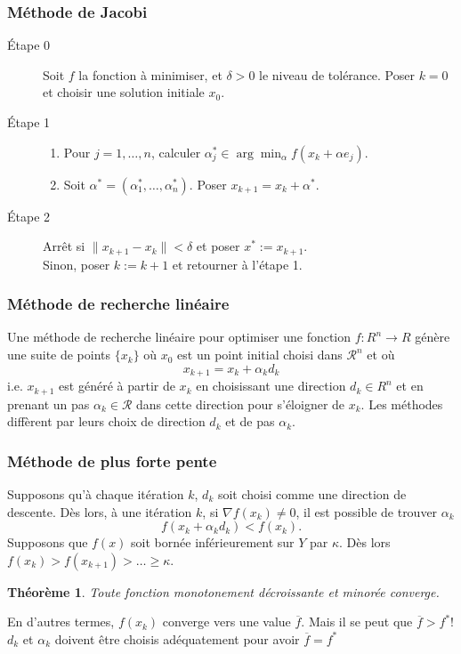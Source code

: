 \documentclass[usepdftitle=false]{beamer}
\newtheorem{thm}{Théorème}
\def\cR{\mathcal{R}}
\begin{document}
\begin{frame}
\frametitle{Méthode de Jacobi}
	
	\begin{description}
		\item[Étape 0]
		Soit $f$ la fonction à minimiser, et $\delta > 0$ le niveau de tolérance.
		Poser $k = 0$ et choisir une solution initiale $x_0$.
		\item[Étape 1]
		\begin{enumerate}
			\item
			Pour $j = 1,\ldots,n$,
				calculer $\alpha_j^* \in \arg\min_{\alpha} f(x_k + \alpha e_j)$.
			\item
			Soit $\alpha^* = (\alpha_1^*,\ldots, \alpha_n^*)$.
			Poser $x_{k+1} = x_k + \alpha^*$.
		\end{enumerate}
		\item[Étape 2]
		Arrêt si $\| x_{k + 1} - x_k \| < \delta$ et poser $x^* := x_{k+1}$.\\
		Sinon, poser $k := k+1$ et retourner à l'étape 1.
	\end{description}

\end{frame}

\begin{frame}
\frametitle{Méthode de recherche linéaire}

Une méthode de recherche linéaire pour optimiser une fonction $f: R^n \rightarrow R$
génère une suite de points $\{ x_k \}$ où $x_0$ est un point initial choisi dans $\cR^n$ et où
$$
x_{k + 1} = x_k + \alpha_k d_k
$$
i.e. $x_{k+1}$ est généré à partir de $x_k$ en choisissant une direction $d_k \in R^n$ et en prenant un pas $\alpha_k \in \cR$ dans cette direction pour s'éloigner de $x_k$.
Les méthodes diffèrent par leurs choix de direction $d_k$ et de pas $\alpha_k$.

\end{frame}

\begin{frame}
\frametitle{Méthode de plus forte pente}

Supposons qu'à chaque itération $k$, $d_k$ soit choisi comme une direction de descente.
Dès lors, à une itération $k$, si $\nabla f(x_k) \ne 0$, il est possible de trouver $\alpha_k$
$$
f(x_k + \alpha_k d_k) < f(x_k).
$$
Supposons que $f(x)$ soit bornée inférieurement sur $Y$ par $\kappa$. Dès lors
$f(x_k) > f(x_{k+1}) > \ldots \geq \kappa$.

\begin{thm}
Toute fonction monotonement décroissante et minorée converge.
\end{thm}
En d'autres termes, $f(x_k)$ converge vers une value $\overline{f}$.
Mais il se peut que $\overline{f} > f^*$! $d_k$ et $\alpha_k$ doivent être choisis adéquatement pour avoir $\overline{f} = f^*$

\end{frame}
\end{document}
